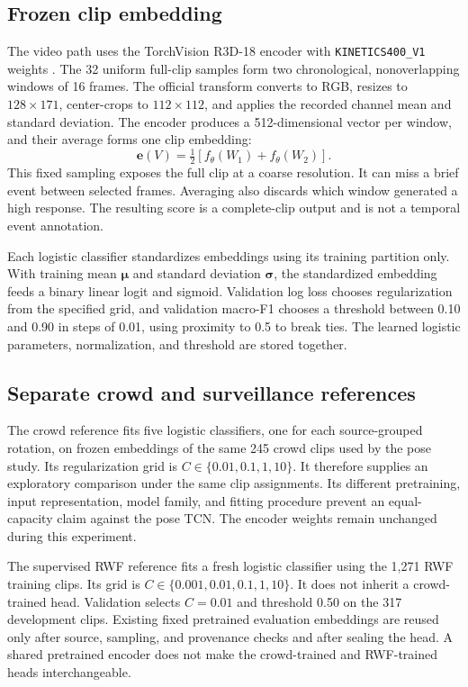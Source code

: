 \documentclass[journal]{IEEEtai}
\begin{document}
\subsection{Frozen clip embedding}
The video path uses the TorchVision R3D-18 encoder with \texttt{KINETICS400\_V1} weights \cite{tran2018,torchvision,kay2017}. The 32 uniform full-clip samples form two chronological, nonoverlapping windows of 16 frames. The official transform converts to RGB, resizes to $128\times171$, center-crops to $112\times112$, and applies the recorded channel mean and standard deviation. The encoder produces a 512-dimensional vector per window, and their average forms one clip embedding:
\begin{equation}
\mathbf{e}(V)=\tfrac12\left[f_\theta(W_1)+f_\theta(W_2)\right].
\label{eq:videoembedding}
\end{equation}
This fixed sampling exposes the full clip at a coarse resolution. It can miss a brief event between selected frames. Averaging also discards which window generated a high response. The resulting score is a complete-clip output and is not a temporal event annotation.

Each logistic classifier standardizes embeddings using its training partition only. With training mean $\boldsymbol\mu$ and standard deviation $\boldsymbol\sigma$, the standardized embedding feeds a binary linear logit and sigmoid. Validation log loss chooses regularization from the specified grid, and validation macro-F1 chooses a threshold between 0.10 and 0.90 in steps of 0.01, using proximity to 0.5 to break ties. The learned logistic parameters, normalization, and threshold are stored together.

\subsection{Separate crowd and surveillance references}
The crowd reference fits five logistic classifiers, one for each source-grouped rotation, on frozen embeddings of the same 245 crowd clips used by the pose study. Its regularization grid is $C\in\{0.01,0.1,1,10\}$. It therefore supplies an exploratory comparison under the same clip assignments. Its different pretraining, input representation, model family, and fitting procedure prevent an equal-capacity claim against the pose TCN. The encoder weights remain unchanged during this experiment.

The supervised RWF reference fits a fresh logistic classifier using the 1,271 RWF training clips. Its grid is $C\in\{0.001,0.01,0.1,1,10\}$. It does not inherit a crowd-trained head. Validation selects $C=0.01$ and threshold 0.50 on the 317 development clips. Existing fixed pretrained evaluation embeddings are reused only after source, sampling, and provenance checks and after sealing the head. A shared pretrained encoder does not make the crowd-trained and RWF-trained heads interchangeable.
\end{document}
